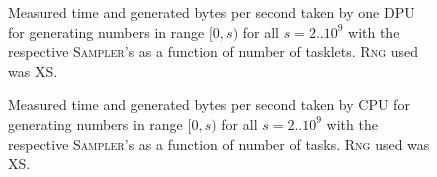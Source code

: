 \documentclass[a4paper]{scrartcl}
\begin{document}
\begin{figure}[!htb] \label{fig:3}
    \caption{
        Measured time and generated bytes per second taken by one DPU for generating numbers in range $[0,s)$ for all $s = 2..10^9$ with the respective \textsc{Sampler}'s as a function of number of tasklets. \textsc{Rng} used was XS.        
    }    
\end{figure}


\begin{figure}[!htb] \label{fig:4}
    \caption{
        Measured time and generated bytes per second taken by CPU for generating numbers in range $[0,s)$ for all $s = 2..10^9$ with the respective \textsc{Sampler}'s as a function of number of tasks. \textsc{Rng} used was XS.        
    }   
\end{figure}
\end{document}
